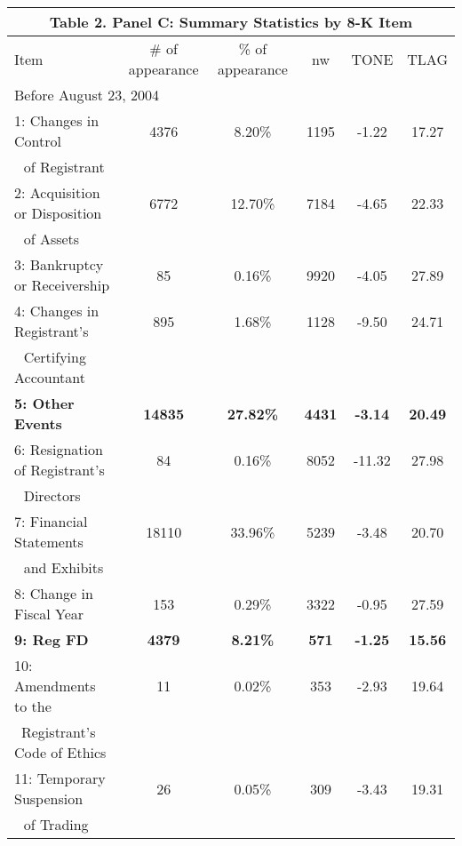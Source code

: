 \begin{table}[H]   \label{T2PC}%
  \begin{center}
  	\begin{tabular}{lccccc}
  		\multicolumn{6}{c}{\textbf{Table 2. Panel C: Summary Statistics by 8-K Item}} \\
  		\midrule
  		\midrule
  		Item & \multicolumn{1}{c}{\# of appearance} & \multicolumn{1}{c}{\% of appearance} & \multicolumn{1}{c}{nw} & \multicolumn{1}{c}{TONE} & \multicolumn{1}{c}{TLAG} \\
  		\midrule
  		\multicolumn{6}{l}{Before August 23, 2004} \\
  		\midrule
  		1: Changes in Control & 4376 & 8.20\% & 1195 & -1.22 & 17.27 \\
  		\: \,\, of Registrant & &  &  &  & \\
  		2: Acquisition or Disposition & 6772 & 12.70\% & 7184 & -4.65 & 22.33 \\
  		\: \,\, of Assets & &  &  &  & \\
  		3: Bankruptcy or Receivership & 85 & 0.16\% & 9920 & -4.05 & 27.89 \\
  		4: Changes in Registrant's & 895 & 1.68\% & 1128 & -9.50 & 24.71 \\
  		\: \,\, Certifying Accountant & &  &  &  & \\
  		\textbf{5: Other Events} & \textbf{14835} & \textbf{27.82\%} & \textbf{4431} & \textbf{-3.14} & \textbf{20.49} \\
  		6: Resignation of Registrant's & 84 & 0.16\% & 8052 & -11.32 & 27.98 \\
  		\: \,\, Directors & &  &  &  & \\
  		7: Financial Statements & 18110 & 33.96\% & 5239 & -3.48 & 20.70 \\
  		\: \,\, and Exhibits & &  &  &  & \\
  		8: Change in Fiscal Year & 153 & 0.29\% & 3322 & -0.95 & 27.59 \\
  		\textbf{9: Reg FD} & \textbf{4379} & \textbf{8.21\%} & \textbf{571} & \textbf{-1.25} & \textbf{15.56} \\
  		10: Amendments to the & 11 & 0.02\% & 353 & -2.93 & 19.64 \\
  		\quad\:\, Registrant's Code of Ethics & &  &  &  & \\
  		11: Temporary Suspension & 26 & 0.05\% & 309 & -3.43 & 19.31 \\
  		\: \,\, of Trading & &  &  &  & \\

\end{tabular}
\end{center}
\end{table}

